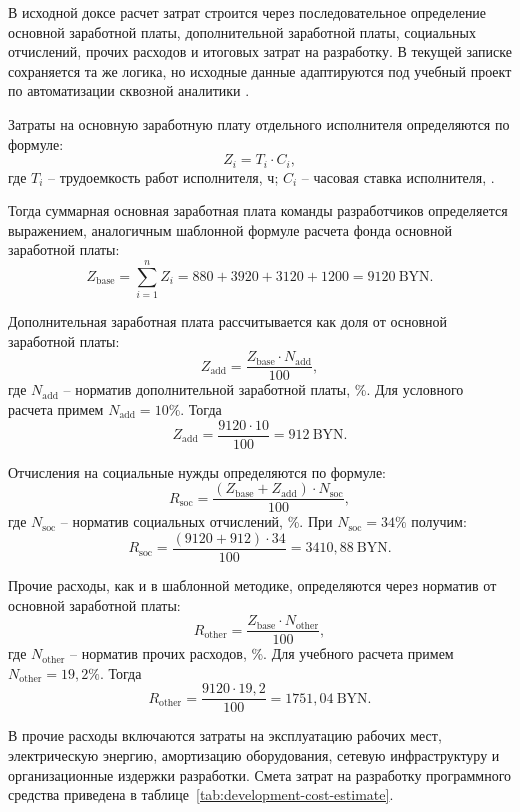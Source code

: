 В исходной доксе расчет затрат строится через последовательное определение основной заработной платы, дополнительной заработной платы, социальных отчислений, прочих расходов и итоговых затрат на разработку. В текущей записке сохраняется та же логика, но исходные данные адаптируются под учебный проект по автоматизации сквозной аналитики .

Затраты на основную заработную плату отдельного исполнителя определяются по формуле:
\[
Z_i = T_i \cdot C_i,
\]
где $T_i$ -- трудоемкость работ исполнителя, ч; $C_i$ -- часовая ставка исполнителя, .

Тогда суммарная основная заработная плата команды разработчиков определяется выражением, аналогичным шаблонной формуле расчета фонда основной заработной платы:
\[
Z_{\text{base}} = \sum_{i=1}^{n} Z_i = 880 + 3920 + 3120 + 1200 = 9120 \ \text{BYN}.
\]

Дополнительная заработная плата рассчитывается как доля от основной заработной платы:
\[
Z_{\text{add}} = \frac{Z_{\text{base}} \cdot N_{\text{add}}}{100},
\]
где $N_{\text{add}}$ -- норматив дополнительной заработной платы, \%. Для условного расчета примем $N_{\text{add}} = 10\%$. Тогда
\[
Z_{\text{add}} = \frac{9120 \cdot 10}{100} = 912 \ \text{BYN}.
\]

Отчисления на социальные нужды определяются по формуле:
\[
R_{\text{soc}} = \frac{(Z_{\text{base}} + Z_{\text{add}}) \cdot N_{\text{soc}}}{100},
\]
где $N_{\text{soc}}$ -- норматив социальных отчислений, \%. При $N_{\text{soc}} = 34\%$ получим:
\[
R_{\text{soc}} = \frac{(9120 + 912) \cdot 34}{100} = 3410{,}88 \ \text{BYN}.
\]

Прочие расходы, как и в шаблонной методике, определяются через норматив от основной заработной платы:
\[
R_{\text{other}} = \frac{Z_{\text{base}} \cdot N_{\text{other}}}{100},
\]
где $N_{\text{other}}$ -- норматив прочих расходов, \%. Для учебного расчета примем $N_{\text{other}} = 19{,}2\%$. Тогда
\[
R_{\text{other}} = \frac{9120 \cdot 19{,}2}{100} = 1751{,}04 \ \text{BYN}.
\]

В прочие расходы включаются затраты на эксплуатацию рабочих мест, электрическую энергию, амортизацию оборудования, сетевую инфраструктуру и организационные издержки разработки. Смета затрат на разработку программного средства приведена в таблице~\ref{tab:development-cost-estimate}.

